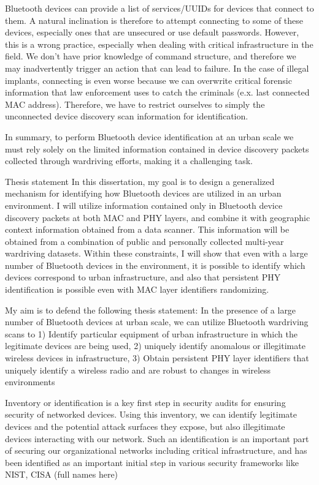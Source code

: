 \begin{dissertationintroduction}
    Bluetooth devices can provide a list of services/UUIDs for devices that connect to them. A natural inclination is therefore to attempt connecting to some of these devices, especially ones that are unsecured or use default passwords. However, this is a wrong practice, especially when dealing with critical infrastructure in the field. We don’t have prior knowledge of command structure, and therefore we may inadvertently trigger an action that can lead to failure. In the case of illegal implants, connecting is even worse because we can overwrite critical forensic information that law enforcement uses to catch the criminals (e.x. last connected MAC address). Therefore, we have to restrict ourselves to simply the unconnected device discovery scan information for identification.
    
    In summary, to perform Bluetooth device identification at an urban scale we must rely solely on the limited information contained in device discovery packets collected through wardriving efforts, making it a challenging task.
    
    Thesis statement 
    In this dissertation, my goal is to design a generalized mechanism for identifying how Bluetooth devices are utilized in an urban environment. I will utilize information contained only in Bluetooth device discovery packets at both MAC and PHY layers, and combine it with geographic context information obtained from a data scanner. This information will be obtained from a combination of public and personally collected multi-year wardriving datasets. Within these constraints, I will show that even with a large number of Bluetooth devices in the environment,  it is possible to identify which devices correspond to urban infrastructure, and also that persistent PHY identification is possible even with MAC layer identifiers randomizing.
    
    My aim is to defend the following thesis statement: In the presence of a large number of Bluetooth devices at urban scale, we can utilize Bluetooth wardriving scans to 1) Identify particular equipment of urban infrastructure in which the legitimate devices are being used, 2) uniquely identify anomalous or illegitimate wireless devices in infrastructure, 3) Obtain persistent PHY layer identifiers that uniquely identify a wireless radio and are robust to changes in wireless environments
    
    
    Inventory or identification is a key first step in security audits for ensuring security of networked devices. Using this inventory, we can identify legitimate devices and the potential attack surfaces they expose, but also illegitimate devices interacting with our network. Such an identification is an important part of securing our organizational networks including critical infrastructure, and has been identified as an important initial step in various security frameworks like NIST, CISA (full names here)
    

\end{dissertationintroduction}
